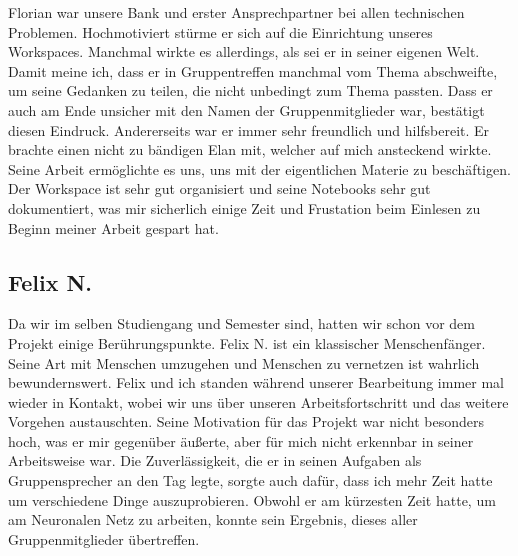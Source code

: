 \documentclass[9pt,a4paper,twocolumn,twoside]{tau-class/tau}
\begin{document}
Florian war unsere Bank und erster Ansprechpartner bei allen technischen Problemen. Hochmotiviert stürme er sich auf die Einrichtung unseres Workspaces.
Manchmal wirkte es allerdings, als sei er in seiner eigenen Welt. Damit meine ich, dass er in Gruppentreffen manchmal vom Thema abschweifte,
um seine Gedanken zu teilen, die nicht unbedingt zum Thema passten. Dass er auch am Ende unsicher mit den Namen der Gruppenmitglieder 
war, bestätigt diesen Eindruck. Andererseits war er immer sehr freundlich und hilfsbereit. Er brachte einen nicht zu bändigen Elan 
mit, welcher auf mich ansteckend wirkte. Seine Arbeit ermöglichte es uns, uns mit der eigentlichen Materie zu beschäftigen. Der Workspace 
ist sehr gut organisiert und seine Notebooks sehr gut dokumentiert, was mir sicherlich einige Zeit und Frustation beim Einlesen zu Beginn meiner Arbeit gespart hat.

\subsection{Felix N.}

Da wir im selben Studiengang und Semester sind, hatten wir schon vor dem Projekt einige Berührungspunkte.
Felix N. ist ein klassischer Menschenfänger. Seine Art mit Menschen umzugehen und Menschen zu vernetzen ist wahrlich bewundernswert. 
Felix und ich standen während unserer Bearbeitung immer mal wieder in Kontakt, wobei wir uns über unseren Arbeitsfortschritt und das weitere Vorgehen austauschten.
Seine Motivation für das Projekt war nicht besonders hoch, was er mir gegenüber äußerte, aber für mich nicht erkennbar in seiner Arbeitsweise war.
Die Zuverlässigkeit, die er in seinen Aufgaben als Gruppensprecher an den Tag legte, sorgte auch dafür, dass ich mehr Zeit hatte um verschiedene Dinge auszuprobieren.
Obwohl er am kürzesten Zeit hatte, um am Neuronalen Netz zu arbeiten, konnte sein Ergebnis, dieses aller Gruppenmitglieder übertreffen. 
\end{document}
